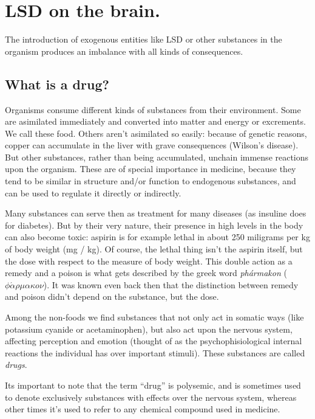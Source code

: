 \section{LSD on the brain.}

The introduction of exogenous entities like LSD or other substances in the organism produces an imbalance with all kinds of consequences.

\subsection{What is a drug?}

Organisms consume different kinds of substances from their environment. Some are asimilated immediately and converted into matter and energy or excrements. We call these food. Others aren't asimilated so easily: because of genetic reasons, copper can accumulate in the liver with grave consequences (Wilson's disease). But other substances, rather than being accumulated, unchain immense reactions upon the organism. These are of special importance in medicine, because they tend to be similar in structure and/or function to endogenous substances, and can be used to regulate it directly or indirectly.

Many substances can serve then as treatment for many diseases (as insuline does for diabetes). But by their very nature, their presence in high levels in the body can also become toxic: aspirin is for example lethal in about 250 miligrams per kg of body weight (mg / kg). Of course, the lethal thing isn't the aspirin itself, but the dose with respect to the measure of body weight. This double action as a remedy and a poison is what gets described by the greek word \textit{phármakon} ($\phi\acute{\alpha}\rho\mu\alpha\kappa o\nu$). It was known even back then that the distinction between remedy and poison didn't depend on the substance, but the dose.

Among the non-foods we find substances that not only act in somatic ways (like potassium cyanide or acetaminophen), but also act upon the nervous system, affecting perception and emotion (thought of as the psychophisiological internal reactions the individual has over important stimuli). These substances are called \textit{drugs}.

Its important to note that the term \enquote{drug} is polysemic, and is sometimes used to denote exclusively substances with effects over the nervous system, whereas other times it's used to refer to any chemical compound used in medicine.

